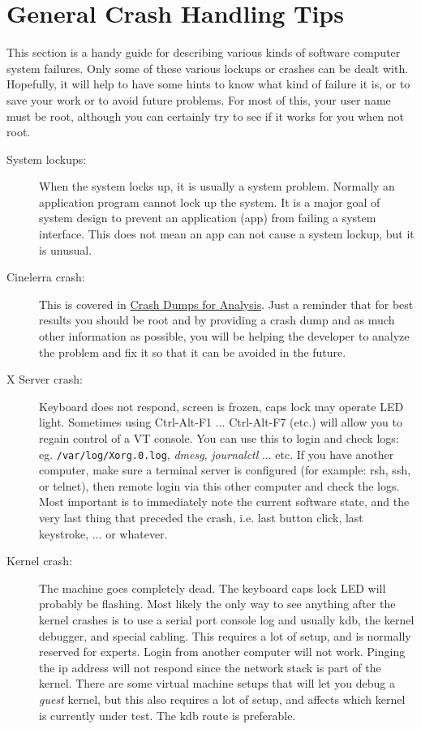 \section{General Crash Handling Tips}%
\label{sec:general_crash_tips}

This section is a handy guide for describing various kinds of software computer system failures.  Only some of these various lockups or crashes can be dealt with.  Hopefully, it will help to have some hints to know what kind of failure it is, or to save your work or to avoid future problems.  For most of this, your user name must be root, although you can certainly try to see if it works for you when not root.

\begin{description}
	\item[System lockups:] When the system locks up, it is usually a system problem.  Normally an application program cannot lock up the system.  It is a major goal of system design to prevent an application (app) from failing a system interface.  This does not mean an app can not cause a system lockup, but it is unusual.
	\item[Cinelerra crash:] This is covered in  \hyperref[cha:crash_dumps_analysis]{Crash Dumps for Analysis}.  Just a reminder that for best results you should be root and by providing a crash dump and as much other information as possible, you will be helping the developer to analyze the problem and fix it so that it can be avoided in the future.
	\item[X Server crash:] Keyboard does not respond, screen is frozen, caps lock may operate LED light.  Sometimes using Ctrl-Alt-F1 $\dots$ Ctrl-Alt-F7 (etc.) will allow you to regain control of a VT console.  You can use this to login and check logs: eg. \texttt{/var/log/Xorg.0.log}, \textit{dmesg}, \textit{journalctl} $\dots$ etc.  If you have another computer, make sure a terminal server is configured (for example: rsh, ssh, or telnet), then remote login via this other computer and check the logs.  Most important is to immediately note the current software state, and the very last thing that preceded the crash, i.e. last button click, last keystroke, $\dots$ or whatever.
	\item[Kernel crash:] The machine goes completely dead.  The keyboard caps lock LED will probably be flashing.  Most likely the only way to see anything after the kernel crashes is to use a serial port console log and usually kdb, the kernel debugger, and special cabling.  This requires a lot of setup, and is normally reserved for experts.  Login from another computer will not work.  Pinging the ip address will not respond since the network stack is part of the kernel.  There are some virtual machine setups that will let you debug a \textit{guest} kernel, but this also requires a lot of setup, and affects which kernel is currently under test.  The kdb route is preferable.

\end{description}
